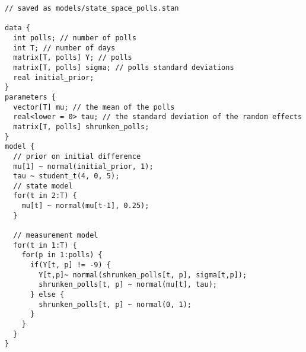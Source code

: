 \documentclass[]{book}
\begin{document}
\begin{verbatim}
// saved as models/state_space_polls.stan

data {
  int polls; // number of polls
  int T; // number of days
  matrix[T, polls] Y; // polls
  matrix[T, polls] sigma; // polls standard deviations
  real initial_prior;
}
parameters {
  vector[T] mu; // the mean of the polls
  real<lower = 0> tau; // the standard deviation of the random effects
  matrix[T, polls] shrunken_polls;
}
model {
  // prior on initial difference
  mu[1] ~ normal(initial_prior, 1);
  tau ~ student_t(4, 0, 5);
  // state model
  for(t in 2:T) {
    mu[t] ~ normal(mu[t-1], 0.25);
  }
  
  // measurement model
  for(t in 1:T) {
    for(p in 1:polls) {
      if(Y[t, p] != -9) {
        Y[t,p]~ normal(shrunken_polls[t, p], sigma[t,p]);
        shrunken_polls[t, p] ~ normal(mu[t], tau);
      } else {
        shrunken_polls[t, p] ~ normal(0, 1);
      }
    }
  }
}
\end{verbatim}
\end{document}
